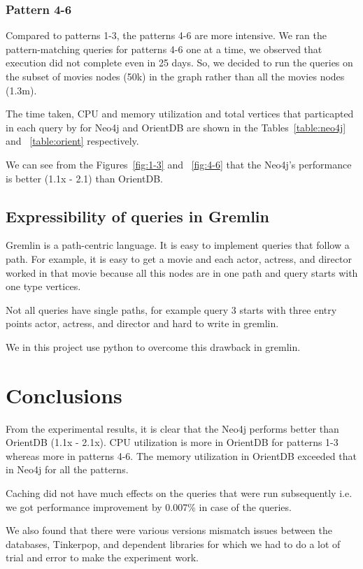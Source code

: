 \subsubsection{Pattern 4-6}

Compared to patterns 1-3, the patterns 4-6 are more intensive. We ran the pattern-matching queries for patterns 4-6 one at a time, we observed that execution did not complete even in 25 days. So, we decided to run the queries on the subset of movies nodes (50k) in the graph rather than all the movies nodes (1.3m). 

The time taken, CPU and memory utilization and total vertices that particapted in each query by for Neo4j and OrientDB are shown in the Tables~\ref{table:neo4j} and ~\ref{table:orient} respectively.

We can see from the Figures~\ref{fig:1-3} and ~\ref{fig:4-6} that the Neo4j's performance is better (1.1x - 2.1) than OrientDB.

\subsection{Expressibility of queries in Gremlin}

Gremlin is a path-centric language. It is easy to implement queries that follow a path. For example, it is easy to get a movie and each actor, actress, and director worked in that movie because all this nodes are in one path and query starts with one type vertices. 

Not all queries have single paths, for example query 3 starts with three entry points actor, actress, and director and hard to write in gremlin.

We in this project use python to overcome this drawback in gremlin. 

\section{Conclusions}
From the experimental results, it is clear that the Neo4j performs better than OrientDB (1.1x - 2.1x). CPU utilization is more in OrientDB  for patterns 1-3 whereas more in patterns 4-6. The memory utilization in OrientDB exceeded that in Neo4j for all the patterns.

Caching did not have much effects on the queries that were run subsequently i.e. we got performance improvement by 0.007\% in case of the queries.

We also found that there were various versions mismatch issues between the databases, Tinkerpop, and dependent libraries for which we had to do a lot of trial and error to make the experiment work.

